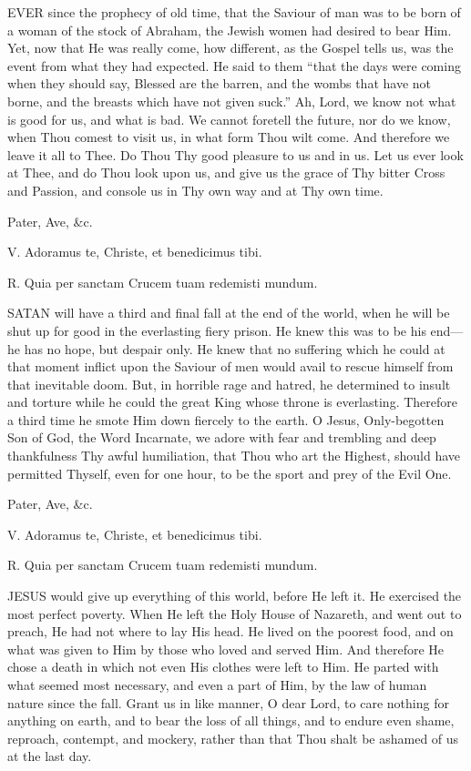 EVER since the
prophecy of old time, that the Saviour of man was to be born of a woman
of the stock of Abraham, the Jewish women had desired to bear Him. Yet,
now that He was really come, how different, as the Gospel tells us, was
the event from what they had expected. He said to them ``that the days
were coming when they should say, Blessed are the barren, and the wombs
that have not borne, and the breasts which have not given suck.'' Ah,
Lord, we know not what is good for us, and what is bad. We cannot
foretell the future, nor do we know, when Thou comest to visit us, in
what form Thou wilt come. And therefore we leave it all to Thee. Do Thou
Thy good pleasure to us and in us. Let us ever look at Thee, and do Thou
look upon us, and give us the grace of Thy bitter Cross and Passion, and
console us in Thy own way and at Thy own time.

Pater, Ave, \&c.


V. Adoramus te, Christe, et
benedicimus tibi.

R. Quia per sanctam Crucem tuam redemisti mundum.

SATAN will have a
third and final fall at the end of the world, when he will be shut up
for good in the everlasting fiery prison. He knew this was to be his
end—he has no hope, but despair only. He knew that no suffering which
he could at that moment inflict upon the Saviour of men would avail to
rescue himself from that inevitable doom. But, in horrible rage and
hatred, he determined to insult and torture while he could the great
King whose throne is everlasting. Therefore a third time he smote Him
down fiercely to the earth. O Jesus, Only-begotten Son of God, the Word
Incarnate, we adore with fear and trembling and deep thankfulness Thy
awful humiliation, that Thou who art the Highest, should have permitted
Thyself, even for one hour, to be the sport and prey of the Evil One.

Pater, Ave, \&c.


V. Adoramus te, Christe, et
benedicimus tibi.

R. Quia per sanctam Crucem tuam redemisti mundum.

JESUS would give up
everything of this world, before He left it. He exercised the most
perfect poverty. When He left the Holy House of Nazareth, and went out
to preach, He had not where to lay His head. He lived on the poorest
food, and on what was given to Him by those who loved and served Him.
And therefore He chose a death in which not even His clothes were left
to Him. He parted with what seemed most necessary, and even a part of
Him, by the law of human nature since the fall. Grant us in like manner,
O dear Lord, to care nothing for anything on earth, and to bear the loss
of all things, and to endure even shame, reproach, contempt, and
mockery, rather than that Thou shalt be ashamed of us at the last day.


